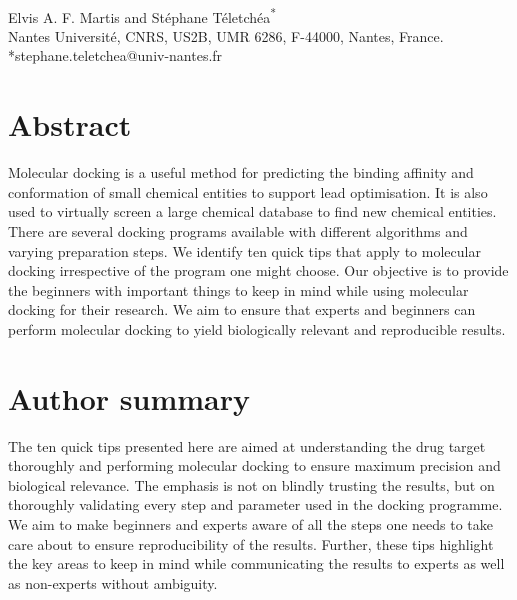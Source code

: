 \documentclass[10pt,letterpaper]{article}
\begin{document}
\vspace*{0.2in}
\begin{flushleft}
{\Large
\textbf{}
}
\newline
\\
Elvis A. F. Martis and
Stéphane Téletchéa\textsuperscript{*}
\\
\bigskip
Nantes Université, CNRS, US2B, UMR 6286, F-44000, Nantes, France.
\bigskip
*stephane.teletchea@univ-nantes.fr

\end{flushleft}
\section*{Abstract}
Molecular docking is a useful method for predicting the binding affinity and conformation of small chemical entities to support lead optimisation. It is also used to virtually screen a large chemical database to find new chemical entities. There are several docking programs available with different algorithms and varying preparation steps. We identify ten quick tips that apply to molecular docking irrespective of the program one might choose. Our objective is to provide the beginners with important things to keep in mind while using molecular docking for their research. We aim to ensure that experts and beginners can perform molecular docking to yield biologically relevant and reproducible results. 

\section*{Author summary}
The ten quick tips presented here are aimed at understanding the drug target thoroughly and performing molecular docking to ensure maximum precision and biological relevance. The emphasis is not on blindly trusting the results, but on thoroughly validating every step and parameter used in the docking programme. We aim to make beginners and experts aware of all the steps one needs to take care about to ensure reproducibility of the results. Further, these tips highlight the key areas to keep in mind while communicating the results to experts as well as non-experts without ambiguity. 

\linenumbers
\end{document}
